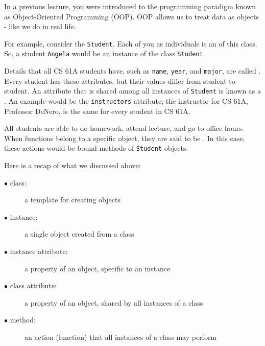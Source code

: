In a previous lecture, you were introduced to the programming paradigm known as
Object-Oriented Programming (OOP). OOP allows us to treat data as objects - like
we do in real life.

For example, consider the  \texttt{Student}. Each of
you as individuals is an  of this class.
So, a student \texttt{Angela} would be an instance of the class
\texttt{Student}.

Details that all CS 61A students have, such as \texttt{name}, \texttt{year}, and
\texttt{major}, are called .  Every student has
these attributes, but their values differ from student to student.  An attribute
that is shared among all instances of \texttt{Student} is known as a
.
An example would be the \texttt{instructors} attribute; the instructor for CS 61A, Professor DeNero, is the same for every student in CS 61A.

All students are able to do homework, attend lecture, and go to office hours.
When functions belong to a specific object, they are said to be
.
In this case, these actions would be bound methods of
\texttt{Student} objects.

Here is a recap of what we discussed above:
\begin{description}
  \item[$\bullet$ class:] a template for creating objects
  \item[$\bullet$ instance:] a single object created from a class
  \item[$\bullet$ instance attribute:] a property of an object, specific to an instance
  \item[$\bullet$ class attribute:] a property of an object, shared by all instances of a class
  \item[$\bullet$ method:] an action (function) that all instances of a class may perform
\end{description}
